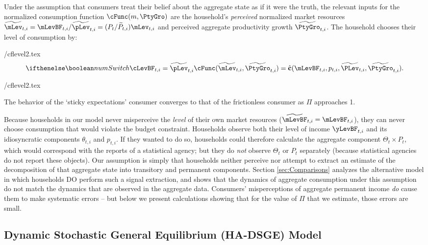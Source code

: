\documentclass[titlepage]{\econtex}\newcommand{\texname}{cAndCwithStickyE}
\begin{document}
Under the assumption that consumers treat their belief about the aggregate state as if it were the truth, the relevant inputs for the normalized consumption function $\cFunc(m,\PtyGro)$ are the household's \textit{perceived} normalized market resources $\perc{\mLev}_{t,i} = \mLevBF_{t,i}/\perc{\pLev}_{t,i} = (P_t/\perc{P}_{t,i})\mLev_{t,i}$ and perceived aggregate productivity growth $\perc{\PtyGro}_{t,i}$.  The household chooses their level of consumption by:
\begin{verbatimwrite}{\eq/cflevel2.tex}
\begin{equation}
 \ifnumSw \cLevBF_{t,i} = \perc{\pLev}_{t,i} \cFunc(\perc{\mLev}_{t,i},\perc{\PtyGro}_{t,i}) = \hat{\textbf{c}}(\mLevBF_{t,i}, p_{t,i}, \perc{\PLev}_{t,i}, \perc{\PtyGro}_{t,i}). \label{eq:cPerc}
\end{equation}
\end{verbatimwrite}
 {\eq/cflevel2.tex}

The behavior of the `sticky expectations' consumer converges to that of the frictionless consumer as $\Pi$ approaches 1.

Because households in our model never misperceive the \textit{level} of their own market resources ($\perc{\mLevBF}_{t,i}=\mLevBF_{t,i}$), they can never choose consumption that would violate the budget constraint.  Households observe both their level of income $\yLevBF_{t,i}$ and its idiosyncratic components $\theta_{t,i}$ and ${p}_{t,i}$. If they wanted to do so, households could therefore calculate the aggregate component $\Theta_{t}\times {P}_{t}$, which would correspond with the reports of a statistical agency; but they do \textit{not} observe $\Theta_{t}$ or ${P}_{t}$ separately (because statistical agencies do not report these objects).  Our assumption is simply that households neither perceive nor attempt to extract an estimate of the decomposition of that aggregate state into transitory and permanent components.  Section \ref{sec:Comparisons} analyzes the alternative model in which households DO perform such a signal extraction, and shows that the dynamics of aggregate consumption under this assumption do not match the dynamics that are observed in the aggregate data.  Consumers'  misperceptions of aggregate permanent income \textit{do} cause them to make systematic errors -- but below we present calculations showing that for the value of $\Pi$ that we estimate, those errors are small.


\subsection{Dynamic Stochastic General Equilibrium (HA-DSGE) Model}
\label{sec:HADSGE}
\end{document}
